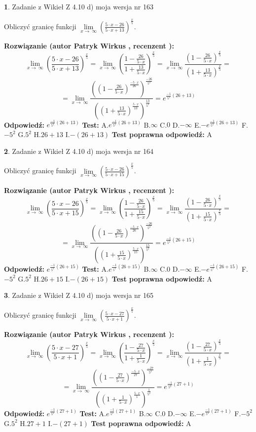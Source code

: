 \documentclass[12pt, a4paper]{article}
\theoremstyle{definition} %
\newtheorem{zad}{}
\newcommand{\zadStart}[1]{\begin{zad}#1\newline}
\newcommand{\zadStop}{\end{zad}}
\newcommand{\rozwStart}[2]{\noindent \textbf{Rozwiązanie (autor #1 , recenzent #2): }\newline}
\newcommand{\rozwStop}{\newline}
\newcommand{\odpStart}{\noindent \textbf{Odpowiedź:}\newline}
\newcommand{\odpStop}{\newline}
\newcommand{\testStart}{\noindent \textbf{Test:}\newline}
\newcommand{\testStop}{\newline}
\newcommand{\kluczStart}{\noindent \textbf{Test poprawna odpowiedź:}\newline}
\newcommand{\kluczStop}{\newline}
\begin{document}
\zadStart{Zadanie z Wikieł Z 4.10 d) moja wersja nr 163}


Obliczyć granicę funkcji  $\lim\limits_{x\to\ \infty}(\frac{5\cdot x-26}{5\cdot x+13})^{\frac{x}{5}}$.
\zadStop
\rozwStart{Patryk Wirkus}{}
$$\lim\limits_{x\to\ \infty}(\frac{5\cdot x-26}{5\cdot x+13})^{\frac{x}{5}} = \lim\limits_{x\to\ \infty}(\frac{1-\frac{26}{5\cdot x}}{1+\frac{13}{5\cdot x}})^{\frac{x}{5}}=\lim\limits_{x\to\ \infty}\frac{(1-\frac{26}{5\cdot x})^{\frac{x}{5}}}{(1+\frac{13}{5\cdot x})^{\frac{x}{5}}}=$$
$$=\lim\limits_{x\to\ \infty}\frac{((1-\frac{26}{5\cdot x})^{\frac{-5\cdot x}{26}})^{\frac{-26}{5^{2}}}}{((1+\frac{13}{5\cdot x})^{\frac{5\cdot x}{13}})^{\frac{13}{5^{2}}}}=e^{\frac{-1}{5^{2}}(26+13)}$$
\rozwStop
\odpStart
$e^{\frac{-1}{5^{2}}(26+13)}$
\odpStop
\testStart
A.$e^{\frac{-1}{5^{2}}(26+13)}$ B.$\infty$ C.$0$ D.$-\infty$ E.$-e^{\frac{-1}{5^{2}}(26+13)}$
F.$-5^{2}$ G.$5^{2}$
H.$26+13$
I.$-(26+13)$
\testStop
\kluczStart
A
\kluczStop



\zadStart{Zadanie z Wikieł Z 4.10 d) moja wersja nr 164}


Obliczyć granicę funkcji  $\lim\limits_{x\to\ \infty}(\frac{5\cdot x-26}{5\cdot x+15})^{\frac{x}{5}}$.
\zadStop
\rozwStart{Patryk Wirkus}{}
$$\lim\limits_{x\to\ \infty}(\frac{5\cdot x-26}{5\cdot x+15})^{\frac{x}{5}} = \lim\limits_{x\to\ \infty}(\frac{1-\frac{26}{5\cdot x}}{1+\frac{15}{5\cdot x}})^{\frac{x}{5}}=\lim\limits_{x\to\ \infty}\frac{(1-\frac{26}{5\cdot x})^{\frac{x}{5}}}{(1+\frac{15}{5\cdot x})^{\frac{x}{5}}}=$$
$$=\lim\limits_{x\to\ \infty}\frac{((1-\frac{26}{5\cdot x})^{\frac{-5\cdot x}{26}})^{\frac{-26}{5^{2}}}}{((1+\frac{15}{5\cdot x})^{\frac{5\cdot x}{15}})^{\frac{15}{5^{2}}}}=e^{\frac{-1}{5^{2}}(26+15)}$$
\rozwStop
\odpStart
$e^{\frac{-1}{5^{2}}(26+15)}$
\odpStop
\testStart
A.$e^{\frac{-1}{5^{2}}(26+15)}$ B.$\infty$ C.$0$ D.$-\infty$ E.$-e^{\frac{-1}{5^{2}}(26+15)}$
F.$-5^{2}$ G.$5^{2}$
H.$26+15$
I.$-(26+15)$
\testStop
\kluczStart
A
\kluczStop



\zadStart{Zadanie z Wikieł Z 4.10 d) moja wersja nr 165}


Obliczyć granicę funkcji  $\lim\limits_{x\to\ \infty}(\frac{5\cdot x-27}{5\cdot x+1})^{\frac{x}{5}}$.
\zadStop
\rozwStart{Patryk Wirkus}{}
$$\lim\limits_{x\to\ \infty}(\frac{5\cdot x-27}{5\cdot x+1})^{\frac{x}{5}} = \lim\limits_{x\to\ \infty}(\frac{1-\frac{27}{5\cdot x}}{1+\frac{1}{5\cdot x}})^{\frac{x}{5}}=\lim\limits_{x\to\ \infty}\frac{(1-\frac{27}{5\cdot x})^{\frac{x}{5}}}{(1+\frac{1}{5\cdot x})^{\frac{x}{5}}}=$$
$$=\lim\limits_{x\to\ \infty}\frac{((1-\frac{27}{5\cdot x})^{\frac{-5\cdot x}{27}})^{\frac{-27}{5^{2}}}}{((1+\frac{1}{5\cdot x})^{\frac{5\cdot x}{1}})^{\frac{1}{5^{2}}}}=e^{\frac{-1}{5^{2}}(27+1)}$$
\rozwStop
\odpStart
$e^{\frac{-1}{5^{2}}(27+1)}$
\odpStop
\testStart
A.$e^{\frac{-1}{5^{2}}(27+1)}$ B.$\infty$ C.$0$ D.$-\infty$ E.$-e^{\frac{-1}{5^{2}}(27+1)}$
F.$-5^{2}$ G.$5^{2}$
H.$27+1$
I.$-(27+1)$
\testStop
\kluczStart
A
\kluczStop
\end{document}
